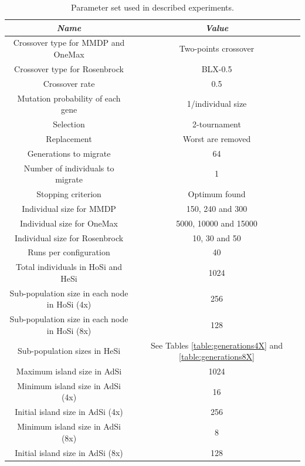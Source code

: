 \documentclass[final,1p,times]{elsarticle}
\begin{document}
\begin{table}
\centering
\caption{Parameter set used in described experiments.}
\begin{tabular}{|c|c|} \hline
{\em Name} & {\em Value}\\ \hline \hline

Crossover type for MMDP and OneMax& Two-points crossover \\ \hline
Crossover type for Rosenbrock& BLX-0.5 \\ \hline
Crossover rate & 0.5\\ \hline
Mutation probability of each gene & 1/individual size\\ \hline
Selection & 2-tournament \\ \hline
Replacement & Worst are removed\\ \hline
Generations to migrate & 64 \\ \hline
Number of individuals to migrate & 1 \\ \hline
Stopping criterion & Optimum found \\ \hline
Individual size for MMDP & 150, 240 and 300  \\ \hline
Individual size for OneMax & 5000, 10000 and 15000 \\ \hline
Individual size for Rosenbrock & 10, 30 and 50 \\ \hline
Runs per configuration & 40 \\ \hline
\hline
Total individuals in HoSi and HeSi & 1024\\ \hline \hline
Sub-population size in each node in HoSi (4x) & 256  \\ \hline
Sub-population size in each node in HoSi (8x) & 128  \\ \hline
Sub-population sizes in HeSi & See Tables \ref{table:generations4X} and \ref{table:generations8X}\\ \hline
\hline
Maximum island size in AdSi & 1024 \\ \hline
Minimum island size in AdSi (4x) & 16 \\ \hline
Initial island size in AdSi (4x) & 256 \\ \hline 
Minimum island size in AdSi (8x) & 8 \\ \hline
Initial island size in AdSi (8x) & 128 \\ \hline 
\end{tabular}
\label{table:parameters}
\end{table}
\end{document}
